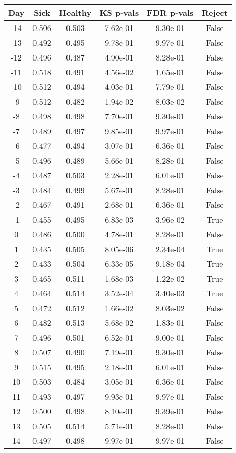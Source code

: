 \begin{tabular}{c|c|c|c|c|c}
Day &  Sick & Healthy &  KS p-vals & FDR p-vals & Reject\\
\hline
-14 & 0.506 &   0.503 &   7.62e-01 &   9.30e-01 &  False\\
-13 & 0.492 &   0.495 &   9.78e-01 &   9.97e-01 &  False\\
-12 & 0.496 &   0.487 &   4.90e-01 &   8.28e-01 &  False\\
-11 & 0.518 &   0.491 &   4.56e-02 &   1.65e-01 &  False\\
-10 & 0.512 &   0.494 &   4.03e-01 &   7.79e-01 &  False\\
 -9 & 0.512 &   0.482 &   1.94e-02 &   8.03e-02 &  False\\
 -8 & 0.498 &   0.498 &   7.70e-01 &   9.30e-01 &  False\\
 -7 & 0.489 &   0.497 &   9.85e-01 &   9.97e-01 &  False\\
 -6 & 0.477 &   0.494 &   3.07e-01 &   6.36e-01 &  False\\
 -5 & 0.496 &   0.489 &   5.66e-01 &   8.28e-01 &  False\\
 -4 & 0.487 &   0.503 &   2.28e-01 &   6.01e-01 &  False\\
 -3 & 0.484 &   0.499 &   5.67e-01 &   8.28e-01 &  False\\
 -2 & 0.467 &   0.491 &   2.68e-01 &   6.36e-01 &  False\\
 -1 & 0.455 &   0.495 &   6.83e-03 &   3.96e-02 &   True\\
  0 & 0.486 &   0.500 &   4.78e-01 &   8.28e-01 &  False\\
  1 & 0.435 &   0.505 &   8.05e-06 &   2.34e-04 &   True\\
  2 & 0.433 &   0.504 &   6.33e-05 &   9.18e-04 &   True\\
  3 & 0.465 &   0.511 &   1.68e-03 &   1.22e-02 &   True\\
  4 & 0.464 &   0.514 &   3.52e-04 &   3.40e-03 &   True\\
  5 & 0.472 &   0.512 &   1.66e-02 &   8.03e-02 &  False\\
  6 & 0.482 &   0.513 &   5.68e-02 &   1.83e-01 &  False\\
  7 & 0.496 &   0.501 &   6.52e-01 &   9.00e-01 &  False\\
  8 & 0.507 &   0.490 &   7.19e-01 &   9.30e-01 &  False\\
  9 & 0.515 &   0.495 &   2.18e-01 &   6.01e-01 &  False\\
 10 & 0.503 &   0.484 &   3.05e-01 &   6.36e-01 &  False\\
 11 & 0.493 &   0.497 &   9.93e-01 &   9.97e-01 &  False\\
 12 & 0.500 &   0.498 &   8.10e-01 &   9.39e-01 &  False\\
 13 & 0.505 &   0.514 &   5.71e-01 &   8.28e-01 &  False\\
 14 & 0.497 &   0.498 &   9.97e-01 &   9.97e-01 &  False\\
\end{tabular}